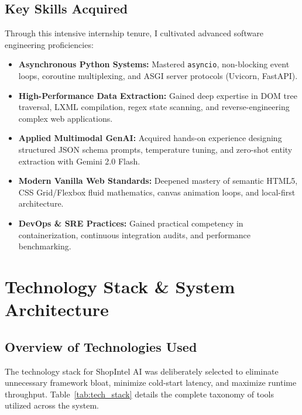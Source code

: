\documentclass[12pt,a4paper,oneside]{report}
\begin{document}
\section{Key Skills Acquired}
Through this intensive internship tenure, I cultivated advanced software engineering proficiencies:
\begin{itemize}
    \item \textbf{Asynchronous Python Systems:} Mastered \texttt{asyncio}, non-blocking event loops, coroutine multiplexing, and ASGI server protocols (Uvicorn, FastAPI).
    \item \textbf{High-Performance Data Extraction:} Gained deep expertise in DOM tree traversal, LXML compilation, regex state scanning, and reverse-engineering complex web applications.
    \item \textbf{Applied Multimodal GenAI:} Acquired hands-on experience designing structured JSON schema prompts, temperature tuning, and zero-shot entity extraction with Gemini 2.0 Flash.
    \item \textbf{Modern Vanilla Web Standards:} Deepened mastery of semantic HTML5, CSS Grid/Flexbox fluid mathematics, canvas animation loops, and local-first architecture.
    \item \textbf{DevOps \& SRE Practices:} Gained practical competency in containerization, continuous integration audits, and performance benchmarking.
\end{itemize}

\chapter{Technology Stack \& System Architecture}

\section{Overview of Technologies Used}
The technology stack for ShopIntel AI was deliberately selected to eliminate unnecessary framework bloat, minimize cold-start latency, and maximize runtime throughput. Table~\ref{tab:tech_stack} details the complete taxonomy of tools utilized across the system.
\end{document}
